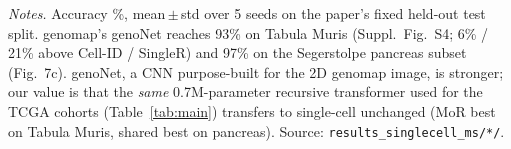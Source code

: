 \documentclass[11pt]{article}
\begin{document}
\vspace{0.3em}
\noindent\footnotesize
\textit{Notes.} Accuracy \%, mean\,$\pm$\,std over 5 seeds on the paper's fixed held-out test
split. genomap's genoNet reaches 93\% on Tabula Muris (Suppl.\ Fig.~S4; 6\% / 21\% above
Cell-ID / SingleR) and 97\% on the Segerstolpe pancreas subset (Fig.~7c). genoNet, a CNN
purpose-built for the 2D genomap image, is stronger; our value is that the \emph{same}
0.7M-parameter recursive transformer used for the TCGA cohorts (Table~\ref{tab:main})
transfers to single-cell unchanged (MoR best on Tabula Muris, shared best on pancreas).
Source: \texttt{results\_singlecell\_ms/*/}.
\end{document}
